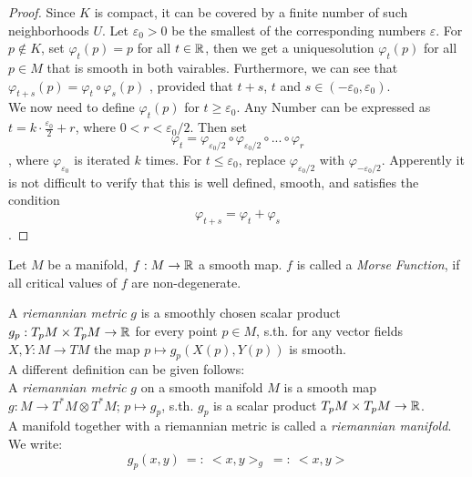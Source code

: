 \documentclass[a4paper,11pt]{article}
\begin{document}
\begin{proof}
   Since $K$ is compact, it can be covered by a finite number of such 
   neighborhoods $U$. Let $\varepsilon_0 > 0$ be the smallest of the 
   corresponding numbers $\varepsilon$. For $p \notin K$, set $\varphi_t(p) = p$
   for all $t \in {\mathbb R}$, then we get a uniquesolution $\varphi_t(p)$ for all 
   $p \in M$ that is smooth in both vairables. Furthermore, we can see that 
   $\varphi_{t+s}(p) = \varphi_t \circ \varphi_s (p)$ , provided that $t+s$, $t$
   and $s \in (-\varepsilon_0, \varepsilon_0)$. \\ 
   We now need to define $\varphi_t(p)$ for $t \geq \varepsilon_0$. Any Number 
   can be expressed as $t = k \cdot \frac{\varepsilon_0}{2} + r$, where 
   $0 < r < \varepsilon_0/2$. Then set 
   \[ \varphi_t = 
   \varphi_{\varepsilon_0/2} \circ \varphi_{\varepsilon_0/2} \circ ... \circ \varphi_r \]
   , where $\varphi_{\varepsilon_0}$ is iterated $k$ times. For 
   $t \leq \varepsilon_0$, replace $\varphi_{\varepsilon_0/2}$ with 
   $\varphi_{-\varepsilon_0/2}$. 
   Apperently it is not difficult to verify that this is well defined, smooth,
   and satisfies the condition \[\varphi_{t+s} = \varphi_t + \varphi_s\].
\end{proof}

\begin{definition}
   \label{def:morse function}

   Let $M$ be a manifold, $f:M \rightarrow {\mathbb R}$ a smooth map. $f$ is called a 
   \textit{Morse Function}, if all critical values of $f$ are non-degenerate.
\end{definition}

\begin{definition}
   \label{def:riemannian metric}
   A \textit{riemannian metric} $g$ is a smoothly chosen scalar product 
   $g_p: T_pM \times T_pM \rightarrow {\mathbb R}$ for every point $p \in M$, s.th. for 
   any vector fields $ X, Y: M \rightarrow TM $ the map 
   $ p \mapsto g_p(X(p), Y(p)) $ is smooth. \\
   A different definition can be given follows: \\
   A \textit{riemannian metric} $g$ on a smooth manifold $M$ is a smooth map 
   $g: M \rightarrow T^*M \otimes T^*M$; $p \mapsto g_p$,
   s.th. $g_p$ is a scalar product $T_pM \times T_pM \rightarrow {\mathbb R}$. \\
   A manifold together with a riemannian metric is called a 
   \textit{riemannian manifold}. \\
   We write:
   \[ g_p(x,y) \: =: \: <x, y>_g \: =: \: <x, y> \]
\end{definition}
\end{document}
